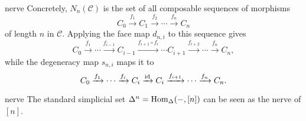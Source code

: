 \begin{example}{nerve}
    Concretely, $N_n(\mathcal{C})$ is the set of all composable sequences of morphisms
    \[ C_0 \xrightarrow{f_1} C_1 \xrightarrow{f_2} \cdots \xrightarrow{f_n} C_n \]
    of length $n$ in $\mathcal{C}$. Applying the face map $d_{n, i}$ to this sequence gives
    \[ C_0 \xrightarrow{f_1} \cdots \xrightarrow{f_{i - 1}} C_{i - 1} \xrightarrow{f_{i + 1} \circ f_i} \cdots C_{i + 1} \xrightarrow{f_{i + 2}} \cdots \xrightarrow{f_n} C_n , \]
    while the degeneracy map $s_{n, i}$ maps it to
    \[ C_0 \xrightarrow{f_1} \cdots \xrightarrow{f_i} C_i \xrightarrow{\textup{id}} C_i \xrightarrow{f_{i + 1}} \cdots \xrightarrow{f_n} C_n . \]
\end{example}

\begin{example}{nerve}
    The standard simplicial set $\Delta^n = \operatorname{Hom}_\Delta(-, [n])$ can be seen as the nerve of $[n]$.
\end{example}

